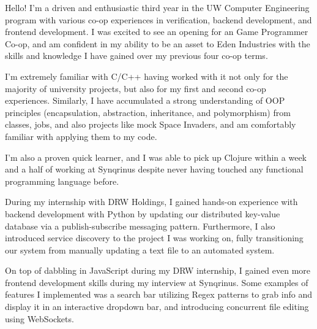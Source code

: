 \documentclass[11pt, a4paper]{awesome-cv}
\begin{document}
\makecvheader[R]


\makelettertitle

\begin{cvletter}

Hello! I'm a driven and enthusiastic third year in the UW Computer Engineering program with various co-op experiences in verification, backend development, and frontend development. I was excited to see an opening for an Game Programmer Co-op, and am confident in my ability to be an asset to Eden Industries with the skills and knowledge I have gained over my previous four co-op terms.

I'm extremely familiar with C/C++ having worked with it not only for the majority of university projects, but also for my first and second co-op experiences. Similarly, I have accumulated a strong understanding of OOP principles (encapsulation, abstraction, inheritance, and polymorphism) from classes, jobs, and also projects like mock Space Invaders, and am comfortably familiar with applying them to my code.

I'm also a proven quick learner, and I was able to pick up Clojure within a week and a half of working at Synqrinus despite never having touched any functional programming language before.

During my internship with DRW Holdings, I gained hands-on experience with backend development with Python by updating our distributed key-value database via a publish-subscribe messaging pattern. Furthermore, I also introduced service discovery to the project I was working on, fully transitioning our system from manually updating a text file to an automated system.

On top of dabbling in JavaScript during my DRW internship, I gained even more frontend development skills during my interview at Synqrinus. Some examples of features I implemented was a search bar utilizing Regex patterns to grab info and display it in an interactive dropdown bar, and introducing concurrent file editing using WebSockets. 


\end{cvletter}
\end{document}
